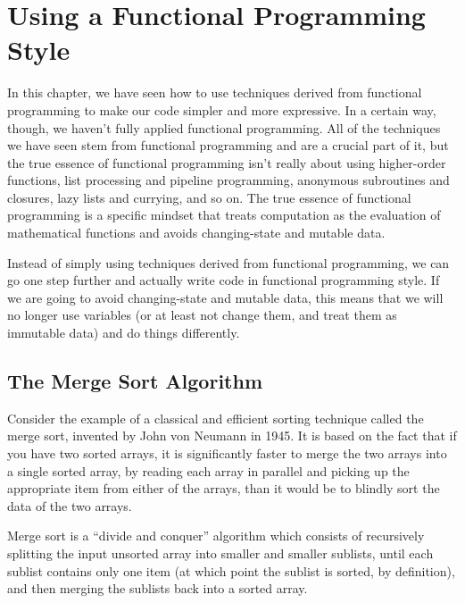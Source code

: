 \section{Using a Functional Programming Style}
\label{funcstyle}

In this chapter, we have seen how to use techniques derived 
from functional programming to make our code simpler and 
more expressive. In a certain way, though, we haven't fully 
applied functional programming. All of the techniques we have 
seen stem from functional programming and are a crucial 
part of it, but the true essence of functional programming 
isn't really about using higher-order functions, list 
processing and pipeline programming, anonymous subroutines 
and closures, lazy lists and currying, and so on. 
The true essence of functional programming is a specific 
mindset that treats computation as the evaluation of mathematical 
functions and avoids changing-state and mutable data.

Instead of simply using techniques derived from functional 
programming, we can go one step further and actually 
write code in functional programming style. If we are going 
to avoid changing-state and mutable data, this means that 
we will no longer use variables (or at least not change them, 
and treat them as immutable data) and do things differently.

\subsection{The Merge Sort Algorithm}
\label{mergesort}

Consider the example of a classical and efficient sorting 
technique called the merge sort, invented by John von Neumann 
in 1945. It is based on the fact that if you have two sorted 
arrays, it is significantly faster to merge the two arrays 
into a single sorted array, by reading each array in parallel and 
picking up the appropriate item from either of the arrays, than 
it would be to blindly sort the data of the two arrays.

Merge sort is a ``divide and conquer'' algorithm which 
consists of recursively splitting the input unsorted array into 
smaller and smaller sublists, until each sublist contains only 
one item (at which point the sublist is sorted, by definition), 
and then merging the sublists back into a sorted array.

